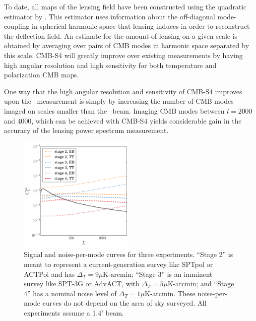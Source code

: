 To date, all maps of the lensing field have been constructed using the quadratic estimator by \cite{Hu:2001kj}.  This estimator uses information about the off-diagonal mode-coupling in spherical harmonic space that lensing induces in order to reconstruct the deflection field.  An estimate for the amount of lensing on a given scale is obtained by averaging over pairs of CMB modes in harmonic space separated by this scale. CMB-S4 will greatly improve over existing measurements by having high angular resolution and high sensitivity for both temperature and polarization CMB maps.

One way that the high angular resolution and sensitivity
of CMB-S4 improves upon the \planck\ measurement is simply
by increasing the number of CMB modes imaged on scales smaller than the \planck\ beam.  Imaging CMB modes between $l=2000$ and 4000, which can be achieved with CMB-S4 yields considerable gain in the accuracy of the lensing power spectrum measurement.

\begin{figure}[htbp]
\centering
\includegraphics[width=0.5\textwidth]{CMBLensing/n0s_s4.pdf}
\caption{Signal and noise-per-mode curves for three experiments. ``Stage 2'' is meant to represent a current-generation survey like SPTpol or ACTPol and has $\Delta_T = 9 \mu$K-arcmin; ``Stage 3'' is an imminent survey like SPT-3G or AdvACT, with $\Delta_T = 5 \mu$K-arcmin; and ``Stage 4'' has a nominal noise level of  $\Delta_T = 1 \mu$K-arcmin.   These noise-per-mode curves do not depend on the area of sky surveyed.  All experiments assume a 1.4' beam.}  
\label{n0s_s4}
\end{figure}


